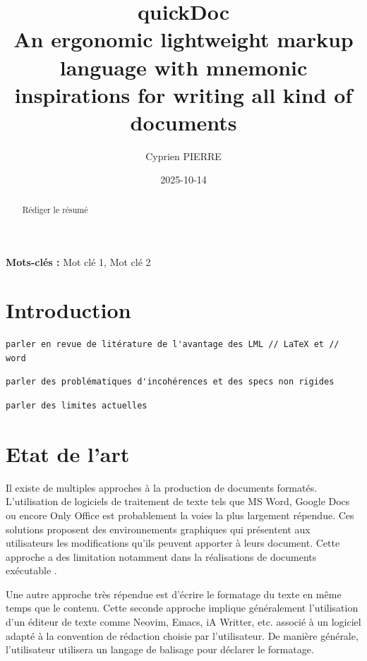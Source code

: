 \documentclass[a4paper,12pt]{article}
\author{Cyprien PIERRE \orcidlink{0009-0009-9040-6795}}
\date{2025-10-14}
\title{quickDoc\\\medskip
\large An ergonomic lightweight markup language with mnemonic inspirations for writing all kind of documents}
\newenvironment{keyword}{\begin{trivlist}\item[]{\bfseries Mots-clés :}}{\end{trivlist}}
\def\footnote#1{}%
\begin{document}
\maketitle
\begin{abstract}
Rédiger le résumé
\end{abstract}

\begin{keyword}
Mot clé 1, Mot clé 2
\end{keyword}
\section{Introduction}
\label{sec:org475b478}

\begin{verbatim}
parler en revue de litérature de l'avantage des LML // LaTeX et // word
\end{verbatim}

\begin{verbatim}
parler des problématiques d'incohérences et des specs non rigides
\end{verbatim}

\begin{verbatim}
parler des limites actuelles
\end{verbatim}
\section{Etat de l'art}
\label{sec:orgf18c2e0}
Il existe de multiples approches à la production de documents formatés. L'utilisation de logiciels de traitement de texte tels que MS Word, Google Docs ou encore Only Office est probablement la voies la plus largement répendue. Ces solutions proposent des environnements graphiques qui présentent aux utilisateurs les modifications qu'ils peuvent apporter à leurs document. Cette approche a des limitation notamment dans la réalisations de documents exécutable \footnote{\textbf{Document exécutable :} Désigne un document dont des éléments sont executé (p. ex. code) et remplacés par le produit de l'exécution (p. ex. schéma ou diagrammes).}.

Une autre approche très répendue est d'écrire le formatage du texte en même temps que le contenu. Cette seconde approche implique généralement l'utilisation d'un éditeur de texte comme Neovim, Emacs, iA Writter, etc. associé à un logiciel adapté à la convention de rédaction choisie par l'utilisateur. De manière générale, l'utilisateur utilisera un langage de balisage pour déclarer le formatage.
\end{document}
